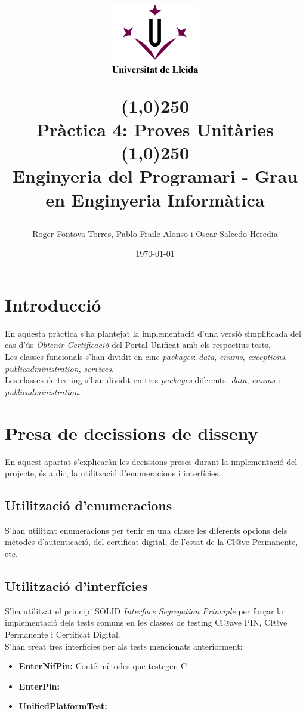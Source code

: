 \documentclass[12pt, letterpaper]{article}
\title{%
    \begin{center}
	\includegraphics[width=4cm,height=3cm]{udl.png}
    \end{center}
    \line(1,0){250}\\[0.3cm]
    \textbf{Pràctica 4: Proves Unitàries}
    \line(1,0){250}
    \\[0.5cm]
	\large Enginyeria del Programari - Grau en Enginyeria Informàtica
}
\author{Roger Fontova Torres, Pablo Fraile Alonso i Oscar Salcedo Heredia}
\date{\today}
\begin{document}
    
\maketitle
\thispagestyle{empty}
\newpage
\tableofcontents
\newpage


\section{Introducció}
\label{introduction}
En aquesta pràctica s'ha plantejat la implementació d'una versió simplificada del cas d'ús  \textit{Obtenir Certificació} del Portal Unificat amb els respectius tests. \\

Les classes funcionals s'han dividit en cinc \textit{packages}: \textit{data}, \textit{enums}, \textit{exceptions}, \textit{publicadministration}, \textit{services}. \\

Les classes de testing s'han dividit en tres \textit{packages} diferents: \textit{data}, \textit{enums} i \textit{publicadministration}.


\section{Presa de decissions de disseny}
\label{decissisions}
En aquest apartat s'explicaràn les decissions preses durant la implementació del projecte, és a dir, la utilització d'enumeracions i interfícies.

\subsection{Utilització d'enumeracions}
\label{enumeracions}
S'han utilitzat enumeracions per tenir en una classe les diferents opcions dels mètodes d'autenticació, del certificat digital, de l'estat de la Cl@ve Permanente, etc.

\subsection{Utilització d'interfícies}
\label{interfaces}
S'ha utilitzat el principi SOLID \textit{Interface Segregation Principle} per forçar la implementació dels tests comuns en les classes de testing Cl@ave PIN, Cl@ve Permanente i Certificat Digital. \\

S'han creat tres interfícies per als tests mencionats anteriorment:
\begin{itemize}
  \item \textbf{EnterNifPin:} Conté mètodes que testegen C
  \item \textbf{EnterPin:}
  \item \textbf{UnifiedPlatformTest:}
\end{itemize}
\end{document}

